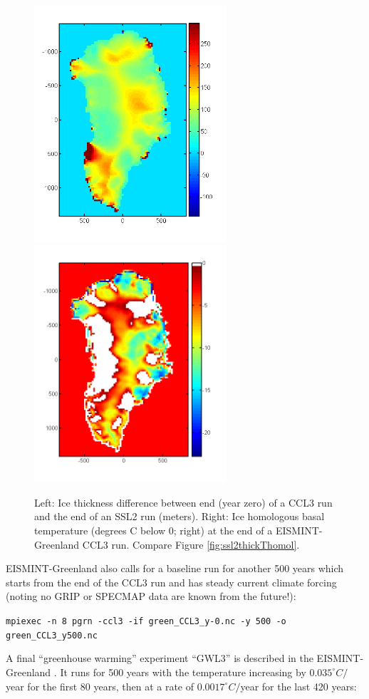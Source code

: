 \documentclass[11pt,final]{amsart}
\begin{document}
\begin{figure}[h]
\includegraphics[width=2.8in]{figs/Hdiff_CCLSSL}\quad\includegraphics[width=2.8in]{figs/Thomol_CCL}
\caption{Left:  Ice thickness difference between end (year zero) of a CCL3 run and the end of an SSL2 run (meters).  Right:  Ice homologous basal temperature (degrees C below 0; right) at the end of a EISMINT-Greenland CCL3 run.  Compare Figure \ref{fig:ssl2thickThomol}.}
\label{fig:cclthickThomol}
\end{figure}

EISMINT-Greenland also calls for a baseline run for another 500 years which starts from the end of the CCL3 run and has steady current climate forcing (noting no GRIP or SPECMAP data are known from the future!):

\verb|mpiexec -n 8 pgrn -ccl3 -if green_CCL3_y-0.nc -y 500 -o green_CCL3_y500.nc|

A final ``greenhouse warming'' experiment ``GWL3'' is described in the EISMINT-Greenland \cite{RitzEISMINT}.  It runs for 500 years with the temperature increasing by $0.035^\circ C/$year for the first 80 years, then at a rate of $0.0017^\circ C/$year for the last 420 years:
\end{document}

